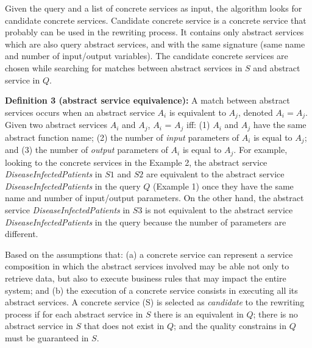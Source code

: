 \documentclass[12pt,a4paper,oneside]{article}
\begin{document}
Given the query and a list of concrete services as input, the algorithm looks for candidate concrete services. 
Candidate concrete service is a concrete service that probably can be used in the rewriting process. 
It contains only abstract services which are also query abstract services, and with the same signature (same name and number of input/output variables).
The candidate concrete services are chosen while searching for matches between abstract services in $S$ and abstract service in $Q$. 

\noindent \textbf{Definition 3 (abstract service equivalence):} 
A match between abstract services occurs when an abstract service $A_{i}$ is equivalent to $A_{j}$, denoted $A_{i} = A_{j}$. 
Given two abstract services $A_{i}$ and $A_{j}$, $A_{i}$ = $A_{j}$ iff: (1) $A_{i}$ and $A_{j}$ have the same abstract function name; (2) the number of \textit{input} parameters of $A_{i}$ is equal to $A_{j}$; and (3) the number of \textit{output} parameters of $A_{i}$ is equal to $A_{j}$. 
For example, looking to the concrete services in the Example 2, the abstract service \textit{DiseaseInfectedPatients} in $S1$ and $S2$ are equivalent to the abstract service \textit{DiseaseInfectedPatients} in the query $Q$ (Example 1) once they have the same name and number of input/output parameters.
On the other hand, the abstract service \textit{DiseaseInfectedPatients} in $S3$ is not equivalent to the abstract service \textit{DiseaseInfectedPatients} in the query because the number of parameters are different.



Based on the assumptions that: (a) a concrete service can represent a service composition in which the abstract services involved may be able not only to retrieve data, but also to execute business rules that may impact the entire system; and (b) the execution of a concrete service consists in executing all its abstract services.  
A concrete service (S) is selected as \textit{candidate} to the rewriting process if for each abstract service in $S$ there is an equivalent in $Q$; there is no abstract service in $S$ that does not exist in $Q$; and the quality constrains in $Q$ must be guaranteed in $S$.
\end{document}
